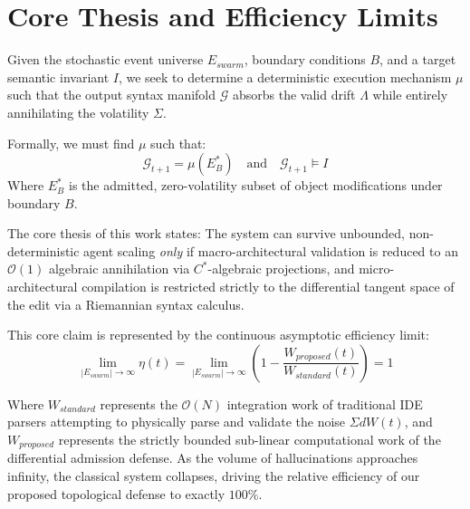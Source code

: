 \section{Core Thesis and Efficiency Limits}

Given the stochastic event universe $E_{swarm}$, boundary conditions $B$, and a target semantic invariant $I$, we seek to determine a deterministic execution mechanism $\mu$ such that the output syntax manifold $\mathcal{G}$ absorbs the valid drift $\Lambda$ while entirely annihilating the volatility $\Sigma$.

Formally, we must find $\mu$ such that:
\begin{equation}
\mathcal{G}_{t+1} = \mu(E_B^*) \quad \text{and} \quad \mathcal{G}_{t+1} \models I
\end{equation}
Where $E_B^*$ is the admitted, zero-volatility subset of object modifications under boundary $B$.

The core thesis of this work states: The system can survive unbounded, non-deterministic agent scaling \textit{only} if macro-architectural validation is reduced to an $\mathcal{O}(1)$ algebraic annihilation via $C^*$-algebraic projections, and micro-architectural compilation is restricted strictly to the differential tangent space of the edit via a Riemannian syntax calculus.

This core claim is represented by the continuous asymptotic efficiency limit:
\begin{equation}
\lim_{|E_{swarm}| \to \infty} \eta(t) = \lim_{|E_{swarm}| \to \infty} \left( 1 - \frac{W_{proposed}(t)}{W_{standard}(t)} \right) = 1
\end{equation}

Where $W_{standard}$ represents the $\mathcal{O}(N)$ integration work of traditional IDE parsers attempting to physically parse and validate the noise $\Sigma dW(t)$, and $W_{proposed}$ represents the strictly bounded sub-linear computational work of the differential admission defense. As the volume of hallucinations approaches infinity, the classical system collapses, driving the relative efficiency of our proposed topological defense to exactly $100\%$.
